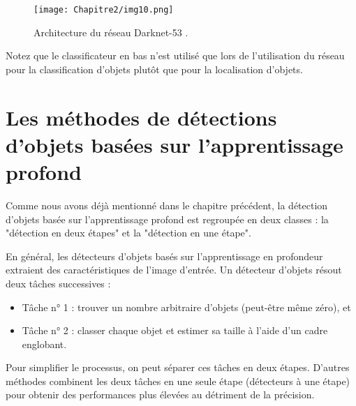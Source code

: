 \begin{enumerate}
           \begin{figure}[H]
                \centering
                \texttt{[image: Chapitre2/img10.png]}
                \caption{Architecture du réseau Darknet-53 \cite{yolov3_paper}.}
                \label{img10}
                \end{figure}

Notez que le classificateur en bas n'est utilisé que lors de l'utilisation du réseau pour la classification d'objets plutôt que pour la localisation d'objets. 

\end{enumerate}


     



          






\section{Les méthodes de détections d'objets basées sur l'apprentissage profond}
Comme nous avons déjà mentionné dans le chapitre précédent, la détection d'objets basée sur l'apprentissage profond est regroupée en deux classes : la "détection en deux étapes" et la "détection en une étape".

En général, les détecteurs d'objets basés sur l'apprentissage en profondeur extraient des caractéristiques de l'image d'entrée. Un détecteur d'objets résout deux tâches successives :
\begin{itemize}
\item  Tâche n° 1 : trouver un nombre arbitraire d'objets (peut-être même zéro), et
\item  Tâche n° 2 : classer chaque objet et estimer sa taille à l'aide d'un cadre englobant.
\end{itemize}

Pour simplifier le processus, on peut séparer ces tâches en deux étapes. D'autres méthodes combinent les deux tâches en une seule étape (détecteurs à une étape) pour obtenir des performances plus élevées au détriment de la précision.

